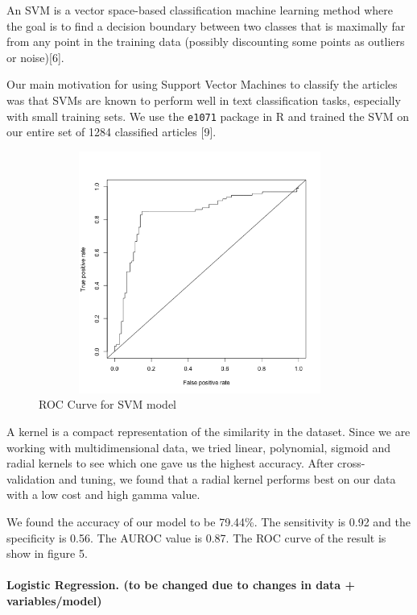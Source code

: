 \documentclass[10pt,letterpaper]{article}
\begin{document}
An SVM is a vector space-based classification machine learning method
where the goal is to find a decision boundary between two classes that
is maximally far from any point in the training data (possibly
discounting some points as outliers or noise){[}6{]}.

Our main motivation for using Support Vector Machines to classify the
articles was that SVMs are known to perform well in text classification
tasks, especially with small training sets. We use the \texttt{e1071}
package in R and trained the SVM on our entire set of 1284 classified
articles {[}9{]}.

\begin{figure}
\includegraphics[width=400px,height=300px]{roc-curve} \caption{ROC Curve for SVM model}\label{fig:unnamed-chunk-4}
\end{figure}

A kernel is a compact representation of the similarity in the dataset.
Since we are working with multidimensional data, we tried linear,
polynomial, sigmoid and radial kernels to see which one gave us the
highest accuracy. After cross-validation and tuning, we found that a
radial kernel performs best on our data with a low cost and high gamma
value.

We found the accuracy of our model to be 79.44\%. The sensitivity is
0.92 and the specificity is 0.56. The AUROC value is 0.87. The ROC curve
of the result is show in figure 5.

\hypertarget{logistic-regression.-to-be-changed-due-to-changes-in-data-variablesmodel}{%
\paragraph{Logistic Regression. (to be changed due to changes in data +
variables/model)}\label{logistic-regression.-to-be-changed-due-to-changes-in-data-variablesmodel}}
\end{document}
